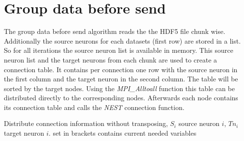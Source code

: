 \documentclass[a4paper]{article}
\begin{document}
\section{Group data before send}
The group data before send algorithm reads the the HDF5 file chunk wise.
Additionally the source neurons for each datasets (first row) are stored in a list.
So for all iterations the source neuron list is available in memory.
This source neuron list and the target neurons from each chunk are used to create a connection table.
It contains per connection one row with the source neuron in the first column and the target neuron in the second column.
The table will be sorted by the target nodes.
Using the \emph{MPI\_Alltoall} function this table can be distributed directly to the corresponding nodes.
Afterwards each node contains its connection table and calls the \emph{NEST} connection function.
\begin{algorithm}
\label{alg2}
\caption{Distribute connection information without transposing, $S_i$ source neuron $i$, $Tn_i$ target neuron $i$.
	set in brackets contains current needed variables}
\end{algorithm}
\end{document}
